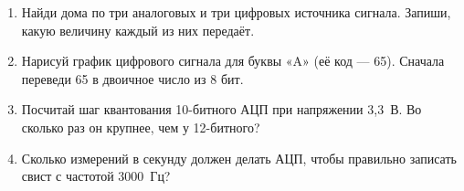 \begin{tasks}
\begin{enumerate}
  \item Найди дома по три аналоговых и три цифровых источника сигнала. Запиши, какую величину каждый из них передаёт.
  \item Нарисуй график цифрового сигнала для буквы «A» (её код --- 65). Сначала переведи 65 в двоичное число из 8 бит.
  \item Посчитай шаг квантования 10-битного АЦП при напряжении 3,3~В. Во сколько раз он крупнее, чем у 12-битного?
  \item Сколько измерений в секунду должен делать АЦП, чтобы правильно записать свист с частотой 3000~Гц?
\end{enumerate}
\end{tasks}

